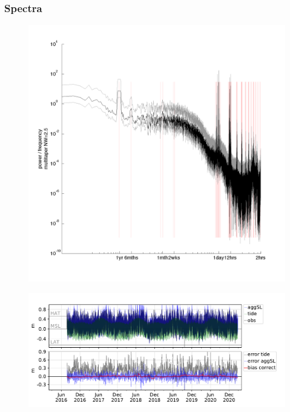 \begin{frame}
\begin{minipage}{0.3\textwidth}
\begin{figure}
    \end{figure} 
\end{minipage}
\end{frame}
\begin{frame}
\frametitle{Spectra}
\begin{minipage}{0.45\textwidth}
    \begin{figure}      
    \includegraphics[width=\textwidth]{figures/plots/spectra_109504.png}
    \end{figure}
\end{minipage}
\hfill
\begin{minipage}{0.45\textwidth}
    \begin{figure}      
     \includegraphics[width=\textwidth]{figures/plots/586204_verify_ts.pdf}
    \end{figure} 
\end{minipage}
\end{frame}

